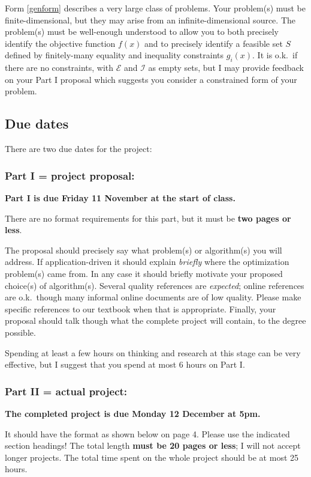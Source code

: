\documentclass[12pt]{amsart}
\begin{document}
Form \eqref{genform} describes a very large class of problems.  Your problem(s) must be finite-dimensional, but they may arise from an infinite-dimensional source.  The problem(s) must be well-enough understood to allow you to both precisely identify the objective function $f(x)$ and to precisely identify a feasible set $S$ defined by finitely-many equality and inequality constraints $g_i(x)$.  It is o.k.~if there are no constraints, with $\mathcal{E}$ and $\mathcal{I}$ as empty sets, but I may provide feedback on your Part I proposal which suggests you consider a constrained form of your problem.


\subsection*{Due dates}  There are two due dates for the project:

\subsubsection*{Part I = project proposal:}  \textbf{Part I is due Friday 11 November at the start of class.}

There are no format requirements for this part, but it must be \textbf{two pages or less}.

The proposal should precisely say what problem(s) or algorithm(s) you will address.  If application-driven it should explain \emph{briefly} where the optimization problem(s) came from.  In any case it should briefly motivate your proposed choice(s) of algorithm(s).  Several quality references are \emph{expected}; online references are o.k.~though many informal online documents are of low quality.  Please make specific references to our textbook when that is appropriate.  Finally, your proposal should talk though what the complete project will contain, to the degree possible.

Spending at least a few hours on thinking and research at this stage can be very effective, but I suggest that you spend at most 6 hours on Part I.

\subsubsection*{Part II = actual project:}  \textbf{The completed project is due Monday 12 December at 5pm.}

It should have the format as shown below on page 4.  Please use the indicated section headings!  The total length \textbf{must be 20 pages or less}; I will not accept longer projects.  The total time spent on the whole project should be at most 25 hours.
\end{document}
